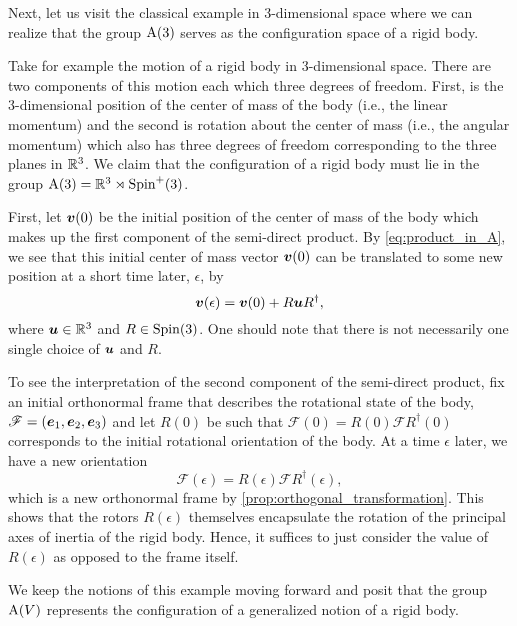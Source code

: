 \documentclass[conf]{new-aiaa}
\begin{document}
Next, let us visit the classical example in 3-dimensional space where we can realize that the group $\operatorname{A}(3)$ serves as the configuration space of a rigid body.

\begin{example}
Take for example the motion of a rigid body in 3-dimensional space. There are two components of this motion each which three degrees of freedom. First, is the 3-dimensional position of the center of mass of the body (i.e., the linear momentum) and the second is rotation about the center of mass (i.e., the angular momentum) which also has three degrees of freedom corresponding to the three planes in $\mathbb{R}^3$. We claim that the configuration of a rigid body must lie in the group $\operatorname{A}(3)=\mathbb{R}^3 \rtimes \operatorname{Spin}^+(3)$. 

First, let $\boldsymbol{v}(0)$ be the initial position of the center of mass of the body which makes up the first component of the semi-direct product. By \cref{eq:product_in_A}, we see that this initial center of mass vector $\boldsymbol{v}(0)$ can be translated to some new position at a short time later, $\epsilon$, by 
\begin{equation}
\boldsymbol{v}(\epsilon) = \boldsymbol{v}(0)+R\boldsymbol{u} R^\dagger,
\end{equation}
where $\boldsymbol{u}\in \mathbb{R}^3$ and $R\in \operatorname{Spin}(3)$. One should note that there is not necessarily one single choice of $\boldsymbol{u}$ and $R$.

To see the interpretation of the second component of the semi-direct product, fix an initial orthonormal frame that describes the rotational state of the body, $\mathscr{F}=(\boldsymbol{e}_1,\boldsymbol{e}_2,\boldsymbol{e}_3)$ and let $R(0)$ be such that $\mathscr{F}(0)=R(0)\mathscr{F}R^\dagger(0)$ corresponds to the initial rotational orientation of the body. At a time $\epsilon$ later, we have a new orientation
\begin{equation}
\mathscr{F}(\epsilon) = R(\epsilon) \mathscr{F} R^\dagger(\epsilon),
\end{equation}
which is a new orthonormal frame by \cref{prop:orthogonal_transformation}. This shows that the rotors $R(\epsilon)$ themselves encapsulate the rotation of the principal axes of inertia of the rigid body. Hence, it suffices to just consider the value of $R(\epsilon)$ as opposed to the frame itself.
\end{example}
We keep the notions of this example moving forward and posit that the group $\operatorname{A}(V)$ represents the configuration of a generalized notion of a rigid body.
\end{document}
